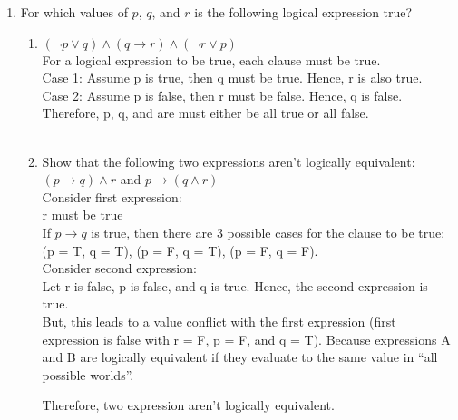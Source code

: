 \documentclass[11pt]{article}
\begin{document}
\begin{enumerate}
\begin{enumerate}
\begin{proof}
  \end{proof}
  
  \end{enumerate}

\newpage
\item For which values of $p$, $q$, and $r$ is the following logical
  expression true?
  \begin{enumerate}
  \item $(\neg p \lor q) \land (q \rightarrow r) \land (\neg r \lor p)$\\
  
    For a logical expression to be true, each clause must be true.\\
    Case 1: Assume p is true, then q must be true. Hence, r is also true.\\
    Case 2: Assume p is false, then r must be false. Hence, q is false.\\
    Therefore, p, q, and are must either be all true or all false.\\
    \\
  
  \item Show that the following two expressions aren’t logically equivalent:\\
  $(p \rightarrow q) \land r$ and $p \rightarrow (q \land r)$\\
  
  Consider first expression:\\
  r must be true\\
  If $p \rightarrow q$ is true, then there are 3 possible cases for the clause to be true: (p = T, q = T), (p = F, q = T), (p = F, q = F).\\
  
  Consider second expression:\\
  Let r is false, p is false, and q is true. Hence, the second expression is true.\\ 
  But, this leads to a value conflict with the first expression (first expression is false with r = F, p = F, and q = T). Because expressions A and B are logically equivalent if they evaluate to the same value in “all possible worlds”.

  Therefore, two expression aren't logically equivalent.


  \end{enumerate}


\end{enumerate}
\end{document}
